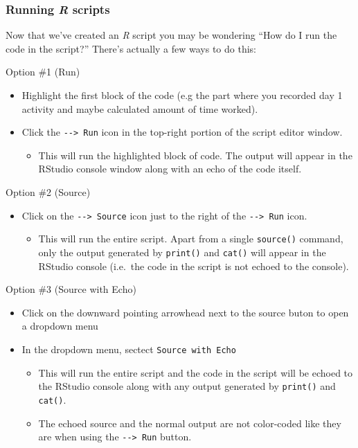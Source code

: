 \documentclass[
]{book}
\providecommand{\tightlist}{%
  \setlength{\itemsep}{0pt}\setlength{\parskip}{0pt}}
\begin{document}
\hypertarget{running-r-scripts}{%
\subsubsection*{\texorpdfstring{Running \emph{R} scripts}{Running R scripts}}\label{running-r-scripts}}

Now that we've created an \emph{R} script you may be wondering ``How do I run the code in the script?'' There's actually a few ways to do this:

Option \#1 (Run)

\begin{itemize}
\tightlist
\item
  Highlight the first block of the code (e.g the part where you recorded day 1 activity and maybe calculated amount of time worked).
\item
  Click the \texttt{-\/-\textgreater{}\ Run} icon in the top-right portion of the script editor window.

  \begin{itemize}
  \tightlist
  \item
    This will run the highlighted block of code. The output will appear in the RStudio console window along with an echo of the code itself.
  \end{itemize}
\end{itemize}

Option \#2 (Source)

\begin{itemize}
\tightlist
\item
  Click on the \texttt{-\/-\textgreater{}\ Source} icon just to the right of the \texttt{-\/-\textgreater{}\ Run} icon.

  \begin{itemize}
  \tightlist
  \item
    This will run the entire script. Apart from a single \texttt{source()} command, only the output generated by \texttt{print()} and \texttt{cat()} will appear in the RStudio console (i.e.~the code in the script is not echoed to the console).
  \end{itemize}
\end{itemize}

Option \#3 (Source with Echo)

\begin{itemize}
\tightlist
\item
  Click on the downward pointing arrowhead next to the source buton to open a dropdown menu
\item
  In the dropdown menu, sectect \texttt{Source\ with\ Echo}

  \begin{itemize}
  \tightlist
  \item
    This will run the entire script and the code in the script will be echoed to the RStudio console along with any output generated by \texttt{print()} and \texttt{cat()}.
  \item
    The echoed source and the normal output are not color-coded like they are when using the \texttt{-\/-\textgreater{}\ Run} button.
  \end{itemize}
\end{itemize}
\end{document}
